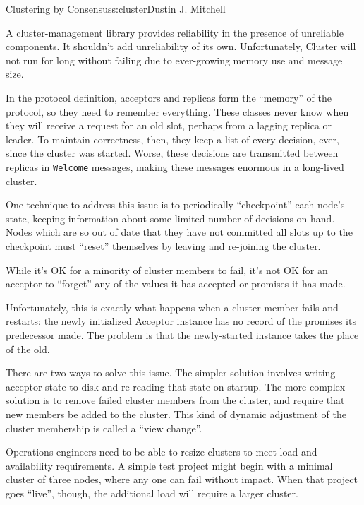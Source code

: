 \begin{aosachapter}{Clustering by Consensus}{s:cluster}{Dustin J. Mitchell}
\label{consistent-memory-usage}

A cluster-management library provides reliability in the presence of
unreliable components. It shouldn't add unreliability of its own.
Unfortunately, Cluster will not run for long without failing due to
ever-growing memory use and message size.

In the protocol definition, acceptors and replicas form the ``memory''
of the protocol, so they need to remember everything. These classes
never know when they will receive a request for an old slot, perhaps
from a lagging replica or leader. To maintain correctness, then, they
keep a list of every decision, ever, since the cluster was started.
Worse, these decisions are transmitted between replicas in
\texttt{Welcome} messages, making these messages enormous in a
long-lived cluster.

One technique to address this issue is to periodically ``checkpoint''
each node's state, keeping information about some limited number of
decisions on hand. Nodes which are so out of date that they have not
committed all slots up to the checkpoint must ``reset'' themselves by
leaving and re-joining the cluster.

\label{persistent-storage}

While it's OK for a minority of cluster members to fail, it's not OK for
an acceptor to ``forget'' any of the values it has accepted or promises
it has made.

Unfortunately, this is exactly what happens when a cluster member fails
and restarts: the newly initialized Acceptor instance has no record of
the promises its predecessor made. The problem is that the newly-started
instance takes the place of the old.

There are two ways to solve this issue. The simpler solution involves
writing acceptor state to disk and re-reading that state on startup. The
more complex solution is to remove failed cluster members from the
cluster, and require that new members be added to the cluster. This kind
of dynamic adjustment of the cluster membership is called a ``view
change''.

\label{view-changes}

Operations engineers need to be able to resize clusters to meet load and
availability requirements. A simple test project might begin with a
minimal cluster of three nodes, where any one can fail without impact.
When that project goes ``live'', though, the additional load will
require a larger cluster.


\end{aosachapter}
